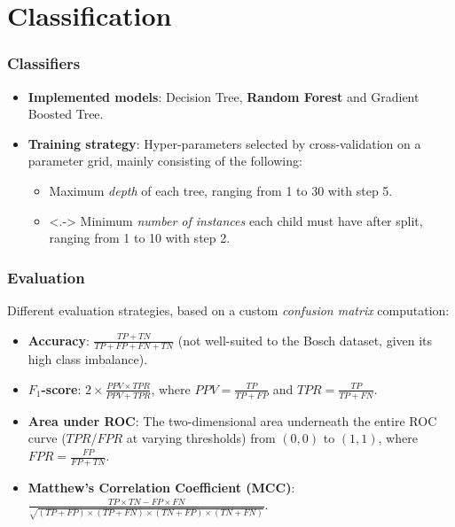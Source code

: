 \documentclass{beamer}
\begin{document}
\section{Classification}
\begin{frame}[<+->]
  \frametitle{Classifiers}
    \begin{itemize}
      \item \textbf{Implemented models}: Decision Tree, \textbf{Random Forest} and Gradient Boosted Tree.
      \item \textbf{Training strategy}: Hyper-parameters selected by cross-validation on a parameter grid, mainly consisting of the following:
      \begin{itemize}
        \item Maximum \textit{depth} of each tree, ranging from 1 to 30 with step 5.
        \item<.-> Minimum \textit{number of instances} each child must have after split, ranging from 1 to 10 with step 2. 
      \end{itemize}
    \end{itemize}
\end{frame}

\begin{frame}
  \frametitle{Evaluation}
  Different evaluation strategies, based on a custom \textit{confusion matrix} computation:
    \begin{itemize}[<+->]
      \item \textbf{Accuracy}: $\frac{TP + TN}{TP + FP + FN + TN}$ (not well-suited to the Bosch dataset, given its high class imbalance).
      \item \textbf{$F_{1}$-score}: $2\times\frac{PPV \times TPR}{PPV + TPR}$, where $PPV = \frac{TP}{TP + FP}$ and $TPR = \frac{TP}{TP + FN}$.
      \item \textbf{Area under ROC}: The two-dimensional area underneath the entire ROC curve ($TPR$/$FPR$ at varying thresholds) from $(0,0)$ to $(1,1)$, where $FPR = \frac{FP}{FP + TN}$.
      \item \textbf{Matthew's Correlation Coefficient (MCC)}: $\frac{TP \times TN - FP \times FN}{\sqrt{(TP + FP) \times (TP + FN) \times (TN + FP) \times (TN + FN)}}$. 
    \end{itemize}
\end{frame}

\end{document}
